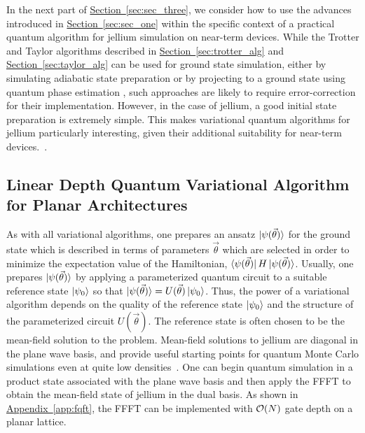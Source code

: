 \documentclass[superscriptaddress,aps,pra,nofootinbib,notitlepage,10pt,longbibliography]{revtex4-1}
\renewcommand{\sec}[1]{\hyperref[sec:#1]{Section~\ref*{sec:#1}}}
\DeclareRobustCommand{\app}[1]{\hyperref[app:#1]{Appendix~\ref*{app:#1}}}
\def\bra#1{\mathinner{\langle{#1}|}}
\def\ket#1{\mathinner{|{#1}\rangle}}
\begin{document}
In the next part of \sec{sec_three}, we consider how to use the advances introduced in \sec{sec_one} within the specific context of a practical quantum algorithm for jellium simulation on near-term devices. While the Trotter and Taylor algorithms described in \sec{trotter_alg} and \sec{taylor_alg} can be used for ground state simulation, either by simulating adiabatic state preparation \cite{BabbushAQChem} or by projecting to a ground state using quantum phase estimation \cite{Kitaev1995,Aspuru-Guzik2005}, such approaches are likely to require error-correction for their implementation. However, in the case of jellium, a good initial state preparation is extremely simple. This makes variational quantum algorithms for jellium particularly interesting, given their additional suitability for near-term devices.~\cite{Peruzzo2013,McClean2015}.


\subsection{Linear Depth Quantum Variational Algorithm for Planar Architectures}
\label{sec:jellium_alg}

As with all variational algorithms, one prepares an ansatz $\ket{\psi(\vec \theta)}$ for the ground state which is described in terms of parameters $\vec \theta$ which are selected in order to minimize the expectation value of the Hamiltonian, $\bra{\psi(\vec \theta)} H \ket{\psi(\vec \theta)}$. Usually, one prepares $\ket{\psi(\vec \theta)}$ by applying a parameterized quantum circuit to a suitable reference state $\ket{\psi_0}$ so that $\ket{\psi(\vec \theta)} = U(\vec \theta) \ket{\psi_0}$. Thus, the power of a variational algorithm depends on the quality of the reference state $\ket{\psi_0}$ and the structure of the parameterized circuit $U(\vec \theta)$. The reference state is often chosen to be the mean-field solution to the problem. Mean-field solutions to jellium are diagonal in the plane wave basis,
and provide useful starting points for quantum Monte Carlo simulations even at quite low densities~\cite{drummond2009phase}. One can begin quantum simulation in a product state associated with the plane wave basis and then apply the FFFT to obtain the mean-field state of jellium in the dual basis. As shown in \app{fqft}, the FFFT can be implemented with ${\cal O}(N)$ gate depth on a planar lattice.
\end{document}

